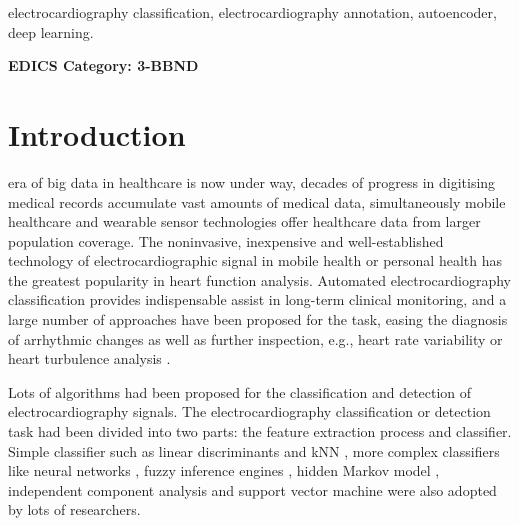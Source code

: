 \documentclass[journal]{IEEEtran}
\begin{document}
\begin{IEEEkeywords}
electrocardiography classification, electrocardiography annotation, autoencoder, deep learning.
\end{IEEEkeywords}

 \ifCLASSOPTIONpeerreview
 \begin{center} \bfseries EDICS Category: 3-BBND \end{center}
 \fi
%
\IEEEpeerreviewmaketitle



\section{Introduction}
% 
% 
% 
% 
 era of big data in healthcare is now under way, decades of progress in digitising medical records accumulate vast amounts of medical data, simultaneously mobile healthcare and wearable sensor technologies offer healthcare data from larger population coverage.
The noninvasive, inexpensive and well-established technology of electrocardiographic signal in mobile health or personal health has the greatest popularity in heart function analysis.
Automated electrocardiography classification provides indispensable assist in long-term clinical monitoring, and a large number of approaches have been proposed for the task, easing the diagnosis of arrhythmic changes as well as further inspection, e.g., heart rate variability or heart turbulence analysis \cite{mar}. 

Lots of algorithms had been proposed for the classification and detection of electrocardiography signals. 
The electrocardiography classification or detection task had been divided into two parts: the feature extraction process and classifier. 
Simple classifier such as linear discriminants \cite{chaza} and kNN \cite{melgan}, more complex classifiers like neural networks \cite{jiang, olmez, lin, osowski}, fuzzy inference engines \cite{osowski, kundu}, hidden Markov model \cite{andreao, coast}, independent component analysis \cite{zhu} and support vector machine  \cite{melgan, kampoura, khandoker} were also adopted by lots of researchers.  
\end{document}
